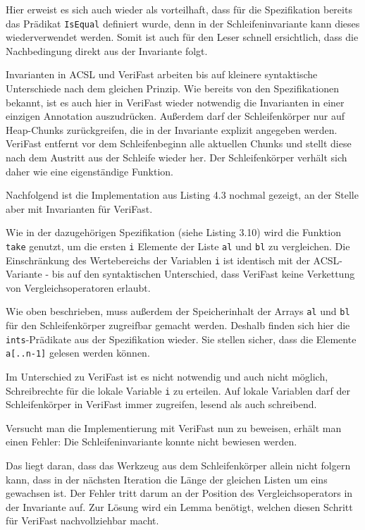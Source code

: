 Hier erweist es sich auch wieder als vorteilhaft, dass für die Spezifikation bereits das Prädikat
\lstinline{IsEqual} definiert wurde, denn in der Schleifeninvariante kann dieses wiederverwendet werden. Somit
ist auch für den Leser schnell ersichtlich, dass die Nachbedingung direkt aus der Invariante folgt.

Invarianten in ACSL und VeriFast arbeiten bis auf kleinere syntaktische Unterschiede nach dem gleichen Prinzip.
Wie bereits von den Spezifikationen bekannt, ist es auch hier in VeriFast wieder notwendig die Invarianten in 
einer einzigen Annotation auszudrücken. Außerdem darf der Schleifenkörper nur auf Heap-Chunks zurückgreifen, die
in der Invariante explizit angegeben werden. VeriFast entfernt vor dem Schleifenbeginn alle aktuellen Chunks
und stellt diese nach dem Austritt aus der Schleife wieder her. Der Schleifenkörper verhält sich daher
wie eine eigenständige Funktion.

\pagebreak
Nachfolgend ist die Implementation aus Listing 4.3 nochmal gezeigt, an der Stelle aber mit Invarianten für VeriFast.



Wie in der dazugehörigen Spezifikation (siehe Listing 3.10) wird die Funktion \lstinline{take} genutzt,
um die ersten \lstinline{i} Elemente der Liste \lstinline{al} und \lstinline{bl} zu vergleichen.
Die Einschränkung des Wertebereichs der Variablen \lstinline{i} ist identisch mit der ACSL-Variante -
bis auf den syntaktischen Unterschied, dass VeriFast keine Verkettung von Vergleichsoperatoren erlaubt.

Wie oben beschrieben, muss außerdem der Speicherinhalt der Arrays \lstinline{al} und \lstinline{bl} für
den Schleifenkörper zugreifbar gemacht werden. Deshalb finden sich hier die \lstinline{ints}-Prädikate
aus der Spezifikation wieder. Sie stellen sicher, dass die Elemente \lstinline{a[..n-1]} gelesen
werden können.

Im Unterschied zu VeriFast ist es nicht notwendig und auch nicht möglich, Schreibrechte für die lokale Variable 
\lstinline{i} zu erteilen. Auf lokale Variablen darf der Schleifenkörper in VeriFast immer zugreifen, lesend
als auch schreibend.

Versucht man die Implementierung mit VeriFast nun zu beweisen, erhält man einen Fehler: Die Schleifeninvariante
konnte nicht bewiesen werden.

Das liegt daran, dass das Werkzeug aus dem Schleifenkörper allein nicht folgern kann, dass in der nächsten Iteration 
die Länge der gleichen Listen um eins gewachsen ist. Der Fehler tritt darum an der Position des Vergleichsoperators in
der Invariante auf. Zur Lösung wird ein Lemma benötigt, welchen diesen Schritt für VeriFast nachvollziehbar macht.



